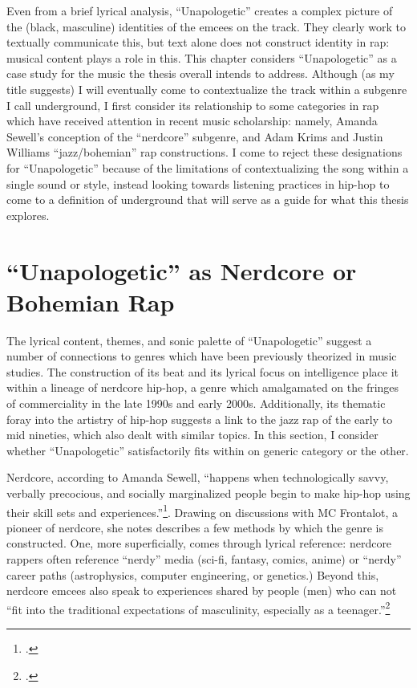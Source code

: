 Even from a brief lyrical analysis, ``Unapologetic'' creates a complex picture of the (black, masculine) identities
of the emcees on the track. They clearly work to textually communicate this, but text alone does not construct identity
in rap: musical content plays a role in this. This chapter considers ``Unapologetic'' as a case study for the music the
thesis overall intends to address. Although (as my title suggests) I will eventually come to contextualize the track
within a subgenre I call underground, I first consider its relationship to some categories in rap which have received
attention in recent music scholarship: namely, Amanda Sewell's conception of the ``nerdcore'' subgenre, and 
Adam Krims and Justin Williams ``jazz/bohemian'' rap constructions. I come to reject these designations for ``Unapologetic''
because of the limitations of contextualizing the song within a single sound or style, instead looking towards listening
practices in hip-hop to come to a definition of underground that will serve as a guide for what this thesis explores.


\section{``Unapologetic'' as Nerdcore or Bohemian Rap} \label{unapologeticnerdcorebohemian}

The lyrical content, themes, and sonic palette of ``Unapologetic'' suggest a number of connections to genres which
have been previously theorized in music studies. The construction of its beat and its lyrical focus on intelligence
place it within a lineage of nerdcore hip-hop, a genre which amalgamated on the fringes of commerciality in the late
1990s and early 2000s. Additionally, its thematic foray into the artistry of hip-hop suggests a link to the jazz rap 
of the early to mid nineties, which also dealt with similar topics. In this section, I consider whether ``Unapologetic''
satisfactorily fits within on generic category or the other.

Nerdcore, according to Amanda Sewell, ``happens when technologically savvy, verbally precocious, and socially marginalized
people begin to make hip-hop using their skill sets and experiences.''\footnote{
    \autocite[223]{amandasewellNerdcoreHiphop2015}.}. 
Drawing on discussions with MC Frontalot, a pioneer of nerdcore, she notes describes a few methods by which the genre is 
constructed. One, more superficially, comes through lyrical reference: nerdcore rappers often reference ``nerdy'' media 
(sci-fi, fantasy, comics, anime) or ``nerdy'' career paths (astrophysics, computer engineering, or genetics.) Beyond this,
nerdcore emcees also speak to experiences shared by people (men) who can not ``fit into the traditional expectations of 
masculinity, especially as a teenager.''\footnote{
    \autocite[225]{amandasewellNerdcoreHiphop2015}.} 

